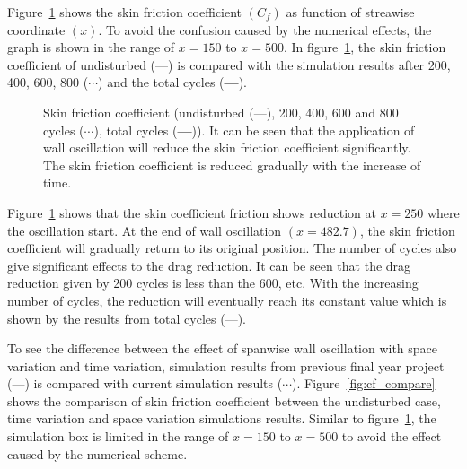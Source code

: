 Figure~\ref{fig:cf_all} shows the skin friction coefficient $(C_f)$ as function of streawise coordinate $(x)$. To avoid the confusion caused by the numerical effects, the graph is shown in the range of $x=150$ to $x=500$. In figure~\ref{fig:cf_all}, the skin friction coefficient of undisturbed (---) is compared with the simulation results after 200, 400, 600, 800 ($\cdots$) and the total cycles (\textbf{---}).  

\begin{figure}[!h]
  \centering
  \caption{Skin friction coefficient (undisturbed (---), 200, 400, 600 and 800 cycles ($\cdots$), total cycles (\textbf{---})). It can be seen that the application of wall oscillation will reduce the skin friction coefficient significantly. The skin friction coefficient is reduced gradually with the increase of time.}
  \label{fig:cf_all}
\end{figure}

Figure~\ref{fig:cf_all} shows that the skin coefficient friction shows reduction at $x=250$ where the oscillation start. At the end of wall oscillation $(x=482.7)$, the skin friction coefficient will gradually return to its original position. The number of cycles also give significant effects to the drag reduction. It can be seen that the drag reduction given by 200 cycles is less than the 600, etc. With the increasing number of cycles, the reduction will eventually reach its constant value which is shown by the results from total cycles (---). 

To see the difference between the effect of spanwise wall oscillation with space variation and time variation, simulation results from previous final year project (---) is compared with current simulation results ($\cdots$). Figure~\ref{fig:cf_compare} shows the comparison of skin friction coefficient between the undisturbed case, time variation and space variation simulations results. Similar to figure~\ref{fig:cf_all}, the simulation box is limited in the range of $x=150$ to $x=500$ to avoid the effect caused by the numerical scheme.

